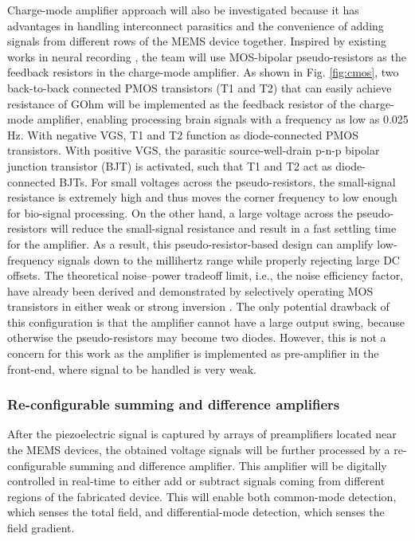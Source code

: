 Charge-mode amplifier approach will also be investigated because it has advantages in handling interconnect parasitics and the convenience of adding signals from different rows of the MEMS device together. Inspired by existing works in neural recording \cite{harrison2003low}, the team will use MOS-bipolar pseudo-resistors as the feedback resistors in the charge-mode amplifier. As shown in Fig. \ref{fig:cmos}, two back-to-back connected PMOS transistors (T1 and T2) that can easily achieve resistance of GOhm will be implemented as the feedback resistor of the charge-mode amplifier, enabling processing brain signals with a frequency as low as 0.025 Hz. With negative VGS, T1 and T2 function as diode-connected PMOS transistors. With positive VGS, the parasitic source-well-drain p-n-p bipolar junction transistor (BJT) is activated, such that T1 and T2 act as diode-connected BJTs. For small voltages across the pseudo-resistors, the small-signal resistance is extremely high and thus moves the corner frequency to low enough for bio-signal processing. On the other hand, a large voltage across the pseudo-resistors will reduce the small-signal resistance and result in a fast settling time for the amplifier. As a result, this pseudo-resistor-based design can amplify low-frequency signals down to the millihertz range while properly rejecting large DC offsets. The theoretical noise–power tradeoff limit, i.e., the noise efficiency factor, have already been derived and demonstrated by selectively operating MOS transistors in either weak or strong inversion \cite{harrison2003low}. The only potential drawback of this configuration is that the amplifier cannot have a large output swing, because otherwise the pseudo-resistors may become two diodes. However, this is not a concern for this work as the amplifier is implemented as pre-amplifier in the front-end, where signal to be handled is very weak.

\subsubsection{Re-configurable summing and difference amplifiers}

After the piezoelectric signal is captured by arrays of preamplifiers located near the MEMS devices, the obtained voltage signals will be further processed by a re-configurable summing and difference amplifier. This amplifier will be digitally controlled in real-time to either add or subtract signals coming from different regions of the fabricated device. This will enable both common-mode detection, which senses the total field, and differential-mode detection, which senses the field gradient.

